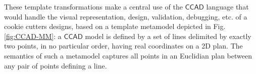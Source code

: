 These template transformations make a central use of the $\mathsf{CCAD}$ 
language that would handle the visual representation, design, validation, 
debugging, etc. of a cookie cutters designs, based on a template metamodel 
depicted in Fig. \ref{fig:CCAD-MM}: a $\mathsf{CCAD}$ model is defined by a set 
of lines delimited by exactly two points, in no particular order, having real 
coordinates on a 2D plan. The semantics of such a metamodel captures all points 
in an Euclidian plan between any pair of points defining a line.


